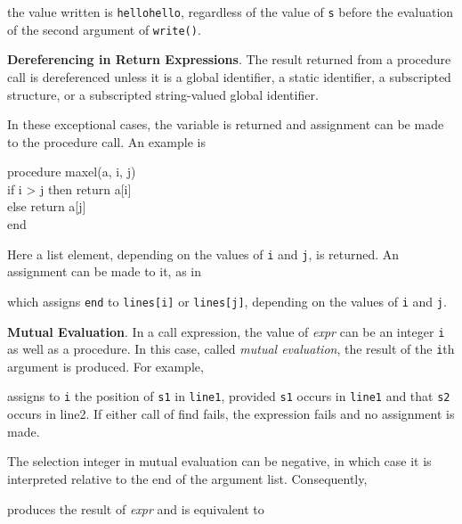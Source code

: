 
\noindent the value written is \texttt{hellohello}, regardless of the
value of \texttt{s} before the evaluation of the second argument of
\texttt{write()}.


\textbf{Dereferencing in Return Expressions}. The result returned from
a procedure call is dereferenced unless it is a global identifier, a
static identifier, a subscripted structure, or a subscripted
string-valued global identifier.

In these exceptional cases, the variable is returned and assignment
can be made to the procedure call. An example is

\begin{iconcode}
\>procedure maxel(a, i, j)\\
\>\>if i > j then return a[i]\\
\>\>else return a[j]\\
\>end
\end{iconcode}

Here a list element, depending on the values of \texttt{i} and
\texttt{j}, is returned. An assignment can be made to it, as in


\noindent which assigns \texttt{{\textquotedbl}end{\textquotedbl}} to
\texttt{lines[i]} or \texttt{lines[j]}, depending on the values of
\texttt{i} and \texttt{j}.


\textbf{Mutual Evaluation}. In a call expression, the value of
\textit{expr}\textit{} can be an integer
\texttt{i} as well as a procedure. In this case, called
\textit{mutual evaluation}, the result of the \texttt{i}th
argument is produced. For example,


\noindent assigns to \texttt{i} the position of \texttt{s1} in
\texttt{line1}, provided \texttt{s1} occurs in \texttt{line1} and that
\texttt{s2} occurs in line2. If either call of find fails, the
expression fails and no assignment is made.

The selection integer in mutual evaluation can be negative, in which
case it is interpreted relative to the end of the argument
list. Consequently,


\noindent
produces the result of \textit{expr} and is equivalent to


